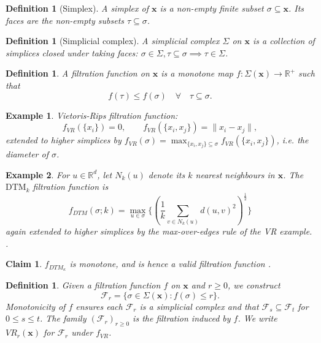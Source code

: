 \documentclass[11pt,letterpaper]{article}
\newcommand{\R}{\mathbb{R}}
\newcommand{\1}{\mathds{1}}
\newcommand{\pc}{\mathbf{x}}
\newcommand{\simpcom}{\Sigma}
\theoremstyle{plain}
\newtheorem{claim}[theorem]{Claim}
\theoremstyle{definitioncolon}
\newtheorem{definition}[theorem]{Definition}
\newtheorem*{example}{Example}
\begin{document}
    \begin{definition}[Simplex]
    \label{def:simplex}
        A \emph{simplex} of $\pc$ is a non-empty finite subset
        $\sigma \subseteq \pc$. Its faces are the non-empty subsets
        $\tau \subseteq \sigma$.
    \end{definition}

    \begin{definition}[Simplicial complex]
    \label{def:simpcomplex}
        A simplicial complex $\simpcom$ on $\pc$ is a collection of simplices
        closed under taking faces: $\sigma \in \simpcom, \tau \subseteq \sigma
        \implies \tau \in \simpcom$.
    \end{definition}

    \begin{definition}
    \label{def:filtfunc}
        A filtration function on $\pc$ is a monotone map
        $f: \Sigma(\pc) \rightarrow \R^+$ such that
            \[
            f(\tau) \leq f(\sigma) \quad \forall \quad \tau \subseteq \sigma.
            \]
    \end{definition}

    \begin{example}
        Vietoris-Rips filtration function:
            \[
            f_{VR}(\{x_i\}) = 0, \qquad f_{VR}(\{x_i, x_j\}) = \|x_i - x_j\|,
            \]
        extended to higher simplices by $f_{VR}(\sigma) = \max_{\{x_i,x_j\}
        \subseteq \sigma} f_{VR}(\{x_i, x_j\})$, i.e. the diameter of $\sigma$.
    \end{example}

    \begin{example}
    \label{ex:dtm}
        For $u \in \R^d$, let $N_k(u)$ denote its $k$ nearest neighbours in
        $\pc$. The $\mathrm{DTM}_k$ filtration function is
            \[
            f_{DTM}(\sigma; k) = \max_{u \in \sigma}\{(\frac{1}{k}
            \sum_{v \in N_k(u)} d(u, v)^2)^{\frac{1}{2}}\}
            \]
        again extended to higher simplices by the max-over-edges rule of the VR
        example. \citep{anai2020dtm}.
    \end{example}

    \begin{claim}
    \label{claim:dtm-monotone}
        $f_{DTM_\kappa}$ is monotone, and is hence a valid filtration function
        \citep[Prop.\ 3.5]{anai2020dtm}.
    \end{claim}

    \begin{definition}
    \label{def:filtration}
        Given a filtration function $f$ on $\pc$ and $r \geq 0$, we construct
            \[
            \mathcal{F}_r = \{\sigma \in \Sigma(\pc) : f(\sigma)
            \leq r\}.
            \]
        Monotonicity of $f$ ensures each $\mathcal{F}_r$ is a simplicial complex
        and that $\mathcal{F}_s \subseteq \mathcal{F}_t$ for $0 \leq s \leq t$.
        The family $(\mathcal{F}_r)_{r \geq 0}$ is the \emph{filtration} induced
        by $f$. We write $VR_r(\pc)$ for $\mathcal{F}_r$ under $f_{VR}$.
    \end{definition}
\end{document}
